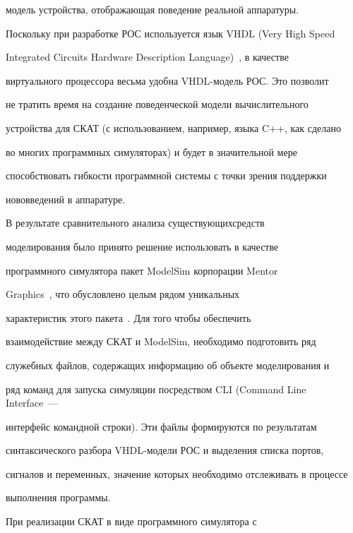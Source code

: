 модель устройства, отображающая поведение реальной ап\-па\-ра\-ту\-ры. 


Поскольку при разработке РОС используется язык VHDL (Very High Speed 


Integrated Circuits Hardware Description Language)~\cite{6-2}, в качестве 


виртуального процессора весьма удобна VHDL-мо\-дель РОС. Это позволит 


не тратить время на создание поведенческой модели вычислительного 


устройства для СКАТ (с использованием, например, языка C++, как сделано 


во многих программных симуляторах) и будет в значительной мере 


способствовать гибкости программной системы с точки зрения поддержки 


нововведений в аппаратуре.


      


      В результате сравнительного анализа существующих\linebreak средств 


моделирования было принято решение использовать в качестве 


программного симулятора пакет ModelSim корпорации Mentor 


Graphics~\cite{7-2}, что обусловлено целым рядом уникальных 


характеристик этого пакета~\cite{8-2}. Для того чтобы обеспечить 


взаимодействие между СКАТ и ModelSim, необходимо подготовить ряд 


служебных файлов, содержащих информацию об объекте моделирования и 


ряд команд для запуска симуляции посредством CLI (Command Line Interface~---


интерфейс командной строки). Эти файлы формируются по результатам 


синтаксического разбора VHDL-мо\-де\-ли РОС и выделения списка портов, 


сигналов и переменных, значение которых необходимо отслеживать в процессе 


выполнения программы.


      


      


      При реализации СКАТ в виде программного симулятора с 


